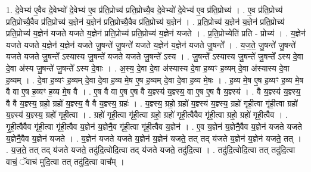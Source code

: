 \documentclass[17pt]{extarticle}
\begin{document}
1. दे॒वेभ्य॑ ए॒वैव दे॒वेभ्यो॑ दे॒वेभ्य॑ ए॒व प्र॑ति॒प्रोच्य॑ प्रति॒प्रोच्यै॒व दे॒वेभ्यो॑ दे॒वेभ्य॑ ए॒व प्र॑ति॒प्रोच्य॑ । . ए॒व प्र॑ति॒प्रोच्य॑ प्रति॒प्रोच्यै॒वैव प्र॑ति॒प्रोच्य॑ य॒ज्ञेन॑ य॒ज्ञेन॑ प्रति॒प्रोच्यै॒वैव प्र॑ति॒प्रोच्य॑ य॒ज्ञेन॑ । . प्र॒ति॒प्रोच्य॑ य॒ज्ञेन॑ य॒ज्ञेन॑ प्रति॒प्रोच्य॑ प्रति॒प्रोच्य॑ य॒ज्ञेन॑ यजते यजते य॒ज्ञेन॑ प्रति॒प्रोच्य॑ प्रति॒प्रोच्य॑ य॒ज्ञेन॑ यजते । . प्र॒ति॒प्रोच्येति॑ प्रति - प्रोच्य॑ । . य॒ज्ञेन॑ यजते यजते य॒ज्ञेन॑ य॒ज्ञेन॑ यजते जु॒षन्ते॑ जु॒षन्ते॑ यजते य॒ज्ञेन॑ य॒ज्ञेन॑ यजते जु॒षन्ते᳚ । . य॒ज॒ते॒ जु॒षन्ते॑ जु॒षन्ते॑ यजते यजते जु॒षन्ते᳚ ऽस्यास्य जु॒षन्ते॑ यजते यजते जु॒षन्ते᳚ ऽस्य । . जु॒षन्ते᳚ ऽस्यास्य जु॒षन्ते॑ जु॒षन्ते᳚ ऽस्य दे॒वा दे॒वा अ॑स्य जु॒षन्ते॑ जु॒षन्ते᳚ ऽस्य दे॒वाः । . अ॒स्य॒ दे॒वा दे॒वा अ॑स्यास्य दे॒वा ह॒व्यꣳ ह॒व्यम् दे॒वा अ॑स्यास्य दे॒वा ह॒व्यम् । . दे॒वा ह॒व्यꣳ ह॒व्यम् दे॒वा दे॒वा ह॒व्य मे॒ष ए॒ष ह॒व्यम् दे॒वा दे॒वा ह॒व्य मे॒षः । . ह॒व्य मे॒ष ए॒ष ह॒व्यꣳ ह॒व्य मे॒ष वै वा ए॒ष ह॒व्यꣳ ह॒व्य मे॒ष वै । . ए॒ष वै वा ए॒ष ए॒ष वै य॒ज्ञ्स्य॑ य॒ज्ञ्स्य॒ वा ए॒ष ए॒ष वै य॒ज्ञ्स्य॑ । . वै य॒ज्ञ्स्य॑ य॒ज्ञ्स्य॒ वै वै य॒ज्ञ्स्य॒ ग्रहो॒ ग्रहो॑ य॒ज्ञ्स्य॒ वै वै य॒ज्ञ्स्य॒ ग्रहः॑ । . य॒ज्ञ्स्य॒ ग्रहो॒ ग्रहो॑ य॒ज्ञ्स्य॑ य॒ज्ञ्स्य॒ ग्रहो॑ गृही॒त्वा गृ॑ही॒त्वा ग्रहो॑ य॒ज्ञ्स्य॑ य॒ज्ञ्स्य॒ ग्रहो॑ गृही॒त्वा । . ग्रहो॑ गृही॒त्वा गृ॑ही॒त्वा ग्रहो॒ ग्रहो॑ गृही॒त्वैवैव गृ॑ही॒त्वा ग्रहो॒ ग्रहो॑ गृही॒त्वैव । . गृ॒ही॒त्वैवैव गृ॑ही॒त्वा गृ॑ही॒त्वैव य॒ज्ञेन॑ य॒ज्ञेनै॒व गृ॑ही॒त्वा गृ॑ही॒त्वैव य॒ज्ञेन॑ । . ए॒व य॒ज्ञेन॑ य॒ज्ञेनै॒वैव य॒ज्ञेन॑ यजते यजते य॒ज्ञेनै॒वैव य॒ज्ञेन॑ यजते । . य॒ज्ञेन॑ यजते यजते य॒ज्ञेन॑ य॒ज्ञेन॑ यजते॒ तत् तद् य॑जते य॒ज्ञेन॑ य॒ज्ञेन॑ यजते॒ तत् । . य॒ज॒ते॒ तत् तद् य॑जते यजते॒ तदु॑दि॒त्वोदि॒त्वा तद् य॑जते यजते॒ तदु॑दि॒त्वा । . तदु॑दि॒त्वोदि॒त्वा तत् तदु॑दि॒त्वा वाचं॒ ॅवाच॑ मुदि॒त्वा तत् तदु॑दि॒त्वा वाच᳚म् । \newline
\end{document}
